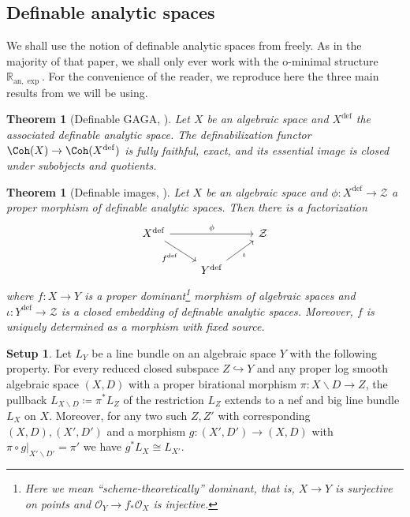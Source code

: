 \documentclass{amsart}
\newcommand{\bs}{\backslash}
\newcommand{\an}{\operatorname{an}}
\newtheorem{thm}[theorem]{Theorem}
\theoremstyle{definition}
\newtheorem{setup}[theorem]{Setup}
\theoremstyle{remark}
\def\bR{\mathbb{R}}
\def\cO{\mathcal{O}}
\def\cZ{\mathcal{Z}}
\def\define{\mathrm{def}}
\def\an{\mathrm{an}}
\numberwithin{equation}{section}
\begin{document}
\subsection{Definable analytic spaces}

We shall use the notion of definable analytic spaces from \cite{BBT23} freely. As in the majority of that paper, we shall only ever work with the o-minimal structure $\bR_{\an,\exp}$.  For the convenience of the reader, we reproduce here the three main results from \cite{BBT23} we will be using.

\begin{thm}[{Definable GAGA, \cite[Theorem 1.4]{BBT23}}]\label{thm:GAGA} Let $X$ be an algebraic space and $X^\define$ the associated definable analytic space.  The definabilization functor $\Coh(X)\to\Coh(X^\define)$ is fully faithful, exact,
 and its essential image is closed under subobjects and quotients.
\end{thm}

\begin{thm}[{Definable images, \cite[Theorem 1.3]{BBT23}}]\label{thm:image} Let $X$ be an algebraic space and $\phi:X^\define\to\cZ$ a proper morphism of definable analytic spaces.  Then there is a factorization
\[\begin{tikzcd}
X^\define\ar[dr,swap,"f^\define"]\ar[rr,"\phi"]&&\cZ\\
&Y^\define\ar[ur,swap,"\iota"] &
\end{tikzcd}\]
where $f:X\to Y$ is a proper dominant\footnote{Here we mean ``scheme-theoretically'' dominant, that is, $X\to Y$ is surjective on points and $\cO_Y\to f_*\cO_X$ is injective.} morphism of algebraic spaces and $\iota:Y^\define \to \cZ$ is a closed embedding of definable analytic spaces.  Moreover, $f$ is uniquely determined as a morphism with fixed source.
\end{thm}

\begin{setup}\label{setup}
Let $L_Y$ be a line bundle on an algebraic space $Y$ with the following property.  For every reduced closed subspace $Z \hookrightarrow Y$ and any proper log smooth algebraic space $(X,D)$ with a proper birational morphism $\pi:X\bs D\to Z$, the pullback $L_{X\bs D}\coloneqq  \pi^*L_Z$ of the restriction $L_{Z}$ extends to a nef and big line bundle $L_{X}$ on $X$.  Moreover, for any two such $Z,Z'$ with corresponding $(X,D),(X',D')$ and a morphism $g:(X',D')\to (X,D)$ with $\pi\circ g|_{X'\bs D'}=\pi'$ we have $g^*L_X\cong L_{X'}$.
\end{setup}
\end{document}
